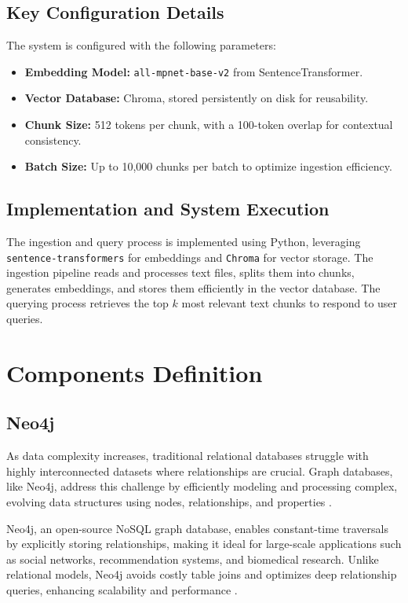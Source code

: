 \subsection{Key Configuration Details}
The system is configured with the following parameters:
\begin{itemize}
    \item \textbf{Embedding Model:} \texttt{all-mpnet-base-v2} from SentenceTransformer.
    \item \textbf{Vector Database:} Chroma, stored persistently on disk for reusability.
    \item \textbf{Chunk Size:} 512 tokens per chunk, with a 100-token overlap for contextual consistency.
    \item \textbf{Batch Size:} Up to 10,000 chunks per batch to optimize ingestion efficiency.
\end{itemize}

\subsection{Implementation and System Execution}
The ingestion and query process is implemented using Python, leveraging \texttt{sentence-transformers} for embeddings and \texttt{Chroma} for vector storage. The ingestion pipeline reads and processes text files, splits them into chunks, generates embeddings, and stores them efficiently in the vector database. The querying process retrieves the top \(k\) most relevant text chunks to respond to user queries.


\section{Components Definition }
\subsection{Neo4j}


As data complexity increases, traditional relational databases struggle with highly interconnected datasets where relationships are crucial. Graph databases, like Neo4j, address this challenge by efficiently modeling and processing complex, evolving data structures using nodes, relationships, and properties \cite{besta2023demystifying}. 

Neo4j, an open-source NoSQL graph database, enables constant-time traversals by explicitly storing relationships, making it ideal for large-scale applications such as social networks, recommendation systems, and biomedical research. Unlike relational models, Neo4j avoids costly table joins and optimizes deep relationship queries, enhancing scalability and performance \cite{besta2023demystifying}. 

